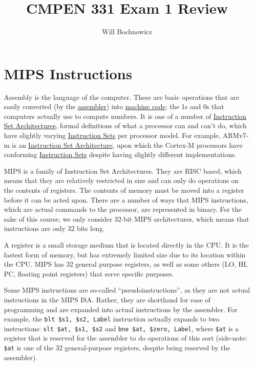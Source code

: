 \documentclass{article}
\title{CMPEN 331 Exam 1 Review}
\author{Will Bochnowicz}
\begin{document}
\maketitle

\tableofcontents

\section{MIPS Instructions}

Assembly is the language of the computer. These are basic operations that are easily converted (by the \underline{assembler}) into \underline{machine code}: the 1s and 0s that computers actually use to compute numbers. It is one of a number of \underline{Instruction Set Architectures}, formal definitions of what a processor can and can't do, which have slightly varying \underline{Instruction Sets} per processor model. For example, ARMv7-m is an \underline{Instruction Set Architecture}, upon which the Cortex-M processors have conforming \underline{Instruction Sets} despite having slightly different implementations. 

MIPS is a family of Instruction Set Architectures. They are RISC based, which means that they are relatively restricted in size and can only do operations on the contents of registers. The contents of memory must be moved into a register before it can be acted upon. There are a number of ways that MIPS instructions, which are actual commands to the processor, are represented in binary. For the sake of this course, we only consider 32-bit MIPS architectures, which means that instructions are only 32 bits long. 

A register is a small storage medium that is located directly in the CPU. It is the fastest form of memory, but has extremely limited size due to its location within the CPU. MIPS has 32 general purpose registers, as well as some others (LO, HI, PC, floating point registers) that serve specific purposes. 

Some MIPS instructions are so-called ``pseudoinstructions'', as they are not actual instructions in the MIPS ISA. Rather, they are shorthand for ease of programming and are expanded into actual instructions by the assembler. For example, the \texttt{blt \$s1, \$s2, Label} instruction actually expands to two instructions: \texttt{slt \$at, \$s1, \$s2} and \texttt{bne \$at, \$zero, Label}, where \texttt{\$at} is a register that is reserved for the assembler to do operations of this sort (side-note: \texttt{\$at} is one of the 32 general-purpose registers, despite being reserved by the assembler). 
\end{document}
